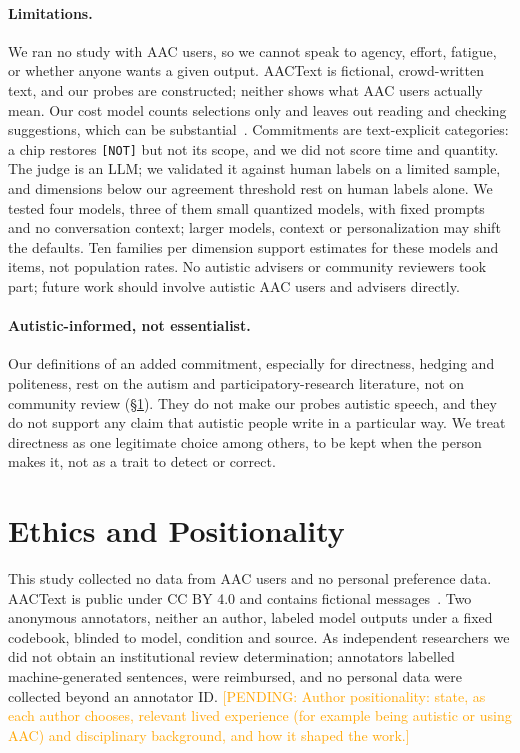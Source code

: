 \documentclass{ceurart}
\newcommand{\chip}[1]{\texttt{[#1]}}
\newcommand{\pending}[1]{\textcolor{orange}{[PENDING: #1]}}
\begin{document}
\paragraph{Limitations.}
We ran no study with AAC users, so we cannot speak to agency, effort, fatigue, or whether anyone wants a given output.
AACText is fictional, crowd-written text, and our probes are constructed; neither shows what AAC users actually mean.
Our cost model counts selections only and leaves out reading and checking suggestions, which can be substantial~\cite{waller2025typetalk}.
Commitments are text-explicit categories: a chip restores \chip{NOT} but not its scope, and we did not score time and quantity.
The judge is an LLM; we validated it against human labels on a limited sample, and dimensions below our agreement threshold rest on human labels alone. %
We tested four models, three of them small quantized models, with fixed prompts and no conversation context; larger models, context or personalization may shift the defaults.
Ten families per dimension support estimates for these models and items, not population rates.
No autistic advisers or community reviewers took part; future work should involve autistic AAC users and advisers directly.

\paragraph{Autistic-informed, not essentialist.}
Our definitions of an added commitment, especially for directness, hedging and politeness, rest on the autism and participatory-research literature, not on community review (\S\ref{sec:ethics}).
They do not make our probes autistic speech, and they do not support any claim that autistic people write in a particular way.
We treat directness as one legitimate choice among others, to be kept when the person makes it, not as a trait to detect or correct.

\section{Ethics and Positionality}
\label{sec:ethics}
This study collected no data from AAC users and no personal preference data.
AACText is public under CC BY 4.0 and contains fictional messages~\cite{vertanen2011imagination}.
Two anonymous annotators, neither an author, labeled model outputs under a fixed codebook, blinded to model, condition and source.
As independent researchers we did not obtain an institutional review determination; annotators labelled machine-generated sentences, were reimbursed, and no personal data were collected beyond an annotator ID. %
\pending{Author positionality: state, as each author chooses, relevant lived experience (for example being autistic or using AAC) and disciplinary background, and how it shaped the work.}
\end{document}
